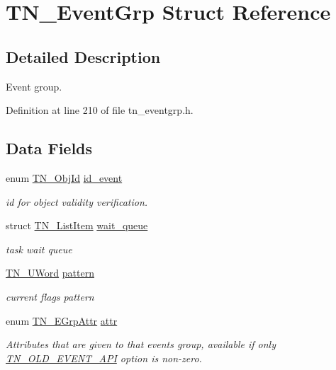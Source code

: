 \hypertarget{structTN__EventGrp}{\section{T\+N\+\_\+\+Event\+Grp Struct Reference}
\label{structTN__EventGrp}
}


\subsection{Detailed Description}
Event group. 

Definition at line 210 of file tn\+\_\+eventgrp.\+h.

\subsection*{Data Fields}
\begin{DoxyCompactItemize}
\item 
enum \hyperlink{tn__common_8h_ae779dd1f6735f6e139fb70acd004d976}{T\+N\+\_\+\+Obj\+Id} \hyperlink{structTN__EventGrp_a0bdf55b6117237122efeefcdf6802d37}{id\+\_\+event}
\begin{DoxyCompactList}\small\item\em id for object validity verification. \end{DoxyCompactList}\item 
\hypertarget{structTN__EventGrp_a93da04331cafe905f9c8b2fa2bad648b}{struct \hyperlink{structTN__ListItem}{T\+N\+\_\+\+List\+Item} \hyperlink{structTN__EventGrp_a93da04331cafe905f9c8b2fa2bad648b}{wait\+\_\+queue}}\label{structTN__EventGrp_a93da04331cafe905f9c8b2fa2bad648b}

\begin{DoxyCompactList}\small\item\em task wait queue \end{DoxyCompactList}\item 
\hypertarget{structTN__EventGrp_abf45ee25e11ea46636920be5003cdec2}{\hyperlink{tn__arch__example_8h_ab80cba0fe9ffcd9011d53dfeb9e39bf4}{T\+N\+\_\+\+U\+Word} \hyperlink{structTN__EventGrp_abf45ee25e11ea46636920be5003cdec2}{pattern}}\label{structTN__EventGrp_abf45ee25e11ea46636920be5003cdec2}

\begin{DoxyCompactList}\small\item\em current flags pattern \end{DoxyCompactList}\item 
enum \hyperlink{tn__eventgrp_8h_aca5ed3b60cdaa2e2db8b88f4b5e33d3f}{T\+N\+\_\+\+E\+Grp\+Attr} \hyperlink{structTN__EventGrp_ac247c74950bd8ae6f721ff220e5a2402}{attr}
\begin{DoxyCompactList}\small\item\em Attributes that are given to that events group, available if only {\ttfamily \hyperlink{tn__cfg__default_8h_ac61d5f6a716cdcab205a2c8afbde4242}{T\+N\+\_\+\+O\+L\+D\+\_\+\+E\+V\+E\+N\+T\+\_\+\+A\+P\+I}} option is non-\/zero. \end{DoxyCompactList}\end{DoxyCompactItemize}


